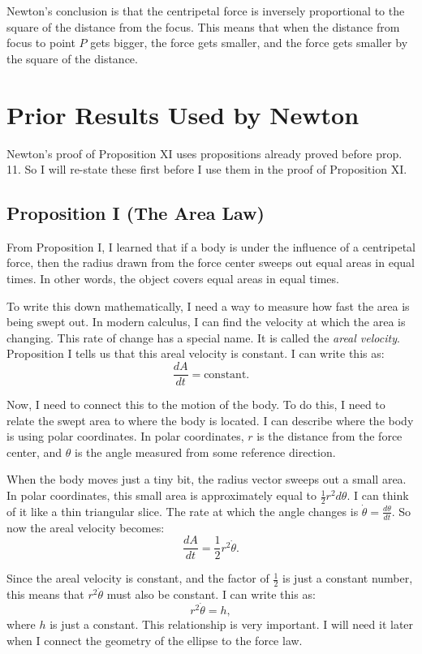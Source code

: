 \documentclass[12pt]{article}
\begin{document}
Newton's conclusion is that the centripetal force is inversely proportional to the square of the distance from the focus. This means that when the distance from focus to point $P$ gets bigger, the force gets smaller, and the force gets smaller by the square of the distance.

\section*{Prior Results Used by Newton}

Newton's proof of Proposition XI uses propositions already proved before prop. 11. So I will re-state these first before I use them in the proof of Proposition XI.

\subsection*{Proposition I (The Area Law)}

From Proposition I, I learned that if a body is under the influence of a centripetal force, then the radius drawn from the force center sweeps out equal areas in equal times. In other words, the object covers equal areas in equal times.

To write this down mathematically, I need a way to measure how fast the area is being swept out. In modern calculus, I can find the velocity at which the area is changing. This rate of change has a special name. It is called the \emph{areal velocity}. Proposition I tells us that this areal velocity is constant. I can write this as:
\[
\frac{dA}{dt} = \text{constant}.
\]

Now, I need to connect this to the motion of the body. To do this, I need to relate the swept area to where the body is located. I can describe where the body is using polar coordinates. In polar coordinates, $r$ is the distance from the force center, and $\theta$ is the angle measured from some reference direction. 

When the body moves just a tiny bit, the radius vector sweeps out a small area. In polar coordinates, this small area is approximately equal to $\frac{1}{2}r^2 d\theta$. I can think of it like a thin triangular slice. The rate at which the angle changes is $\dot{\theta} = \frac{d\theta}{dt}$. So now the areal velocity becomes:
\[
\frac{dA}{dt} = \frac{1}{2}r^2 \dot{\theta}.
\]

Since the areal velocity is constant, and the factor of $\frac{1}{2}$ is just a constant number, this means that $r^2 \dot{\theta}$ must also be constant. I can write this as:
\[
r^{2}\dot{\theta} = h,
\]
where $h$ is just a constant. This relationship is very important. I will need it later when I connect the geometry of the ellipse to the force law.
\end{document}
